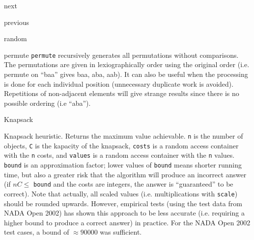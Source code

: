 \begin{algorithm}{next}
\end{algorithm}
\begin{algorithm}{previous}
\end{algorithm}
\begin{algorithm}{random}
\end{algorithm}
\begin{algorithm}{permute}
\desc
{\tt permute} recursively generates all permutations
without comparisons. The permutations are given in lexiographically order
using the original order (i.e. permute on ``baa'' gives baa, aba, aab).
It can also be useful when the processing is done for each individual
position (unnecessary duplicate work is avoided). Repetitions of non-adjacent
elements will give strange results since there is no possible ordering
(i.e ``aba'').
\end{algorithm}



\begin{algorithm}{Knapsack}

\desc
Knapsack heuristic. Returns the maximum value achievable. {\tt n} is the number of objects, {\tt C} is the kapacity of the knapsack, {\tt costs} is a random access container with the {\tt n} costs, and {\tt values} is a random access container with the {\tt n} values. {\tt bound} is an approximation factor; lower values of {\tt bound} means shorter running time, but also a greater risk that the algorithm will produce an incorrect answer (if $nC \le $ {\tt bound} and the costs are integers, the answer is ``guaranteed'' to be correct). Note that actually, all scaled values (i.e. multiplications with {\tt scale}) should be rounded upwards. However, empirical tests (using the test data from NADA Open 2002) has shown this approach to be less accurate (i.e. requiring a higher bound to produce a correct answer) in practice. For the NADA Open 2002 test cases, a bound of $\approx 90000$ was sufficient.


\end{algorithm}

\begin{sourceslandscape}
\end{sourceslandscape}
